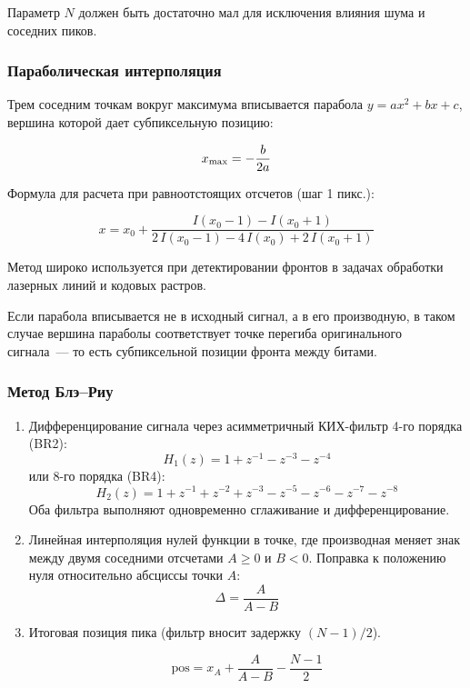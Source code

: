 Параметр $N$ должен быть достаточно мал для исключения влияния шума и соседних пиков.

\subsubsection{Параболическая интерполяция \cite{phase_matching_sampling} \cite{blais_rioux_peak}}

Трем соседним точкам вокруг максимума вписывается парабола $y = ax^2 + bx + c$, вершина которой дает субпиксельную позицию:

$$
x_{\rm max} = -\frac{b}{2a}
$$

Формула для расчета при равноотстоящих отсчетов (шаг 1 пикс.):

$$
x = x_0 + \frac{I(x_0 - 1) - I(x_0 + 1)}
               {2\,I(x_0 - 1) - 4\,I(x_0) + 2\,I(x_0 + 1)}
$$

Метод широко используется при детектировании фронтов в задачах обработки лазерных линий и кодовых растров.

Если парабола вписывается не в исходный сигнал, а в его производную, в таком случае вершина параболы соответствует точке перегиба оригинального сигнала~--- то есть субпиксельной позиции фронта между битами.

\subsubsection{Метод Блэ–Риу \cite{blais_rioux_peak}}

\begin{enumerate}
\item Дифференцирование сигнала через асимметричный КИХ-фильтр 4-го порядка (BR2):
$$
H_1(z) = 1 + z^{-1} - z^{-3} - z^{-4}
$$
или 8-го порядка (BR4):
$$
H_2(z) = 1 + z^{-1} + z^{-2} + z^{-3} - z^{-5} - z^{-6} - z^{-7} - z^{-8}
$$
Оба фильтра выполняют одновременно сглаживание и дифференцирование.

\item Линейная интерполяция нулей функции в точке, где производная меняет знак между
двумя соседними отсчетами $A \geq 0$ и $B < 0$. 
Поправка к положению нуля относительно абсциссы точки $A$:
$$
\Delta = \frac{A}{A - B}
$$

\item Итоговая позиция пика (фильтр вносит задержку $(N-1)/2$).

$$\mathrm{pos} = x_A + \frac{A}{A-B} - \frac{N-1}{2}$$

\end{enumerate}


